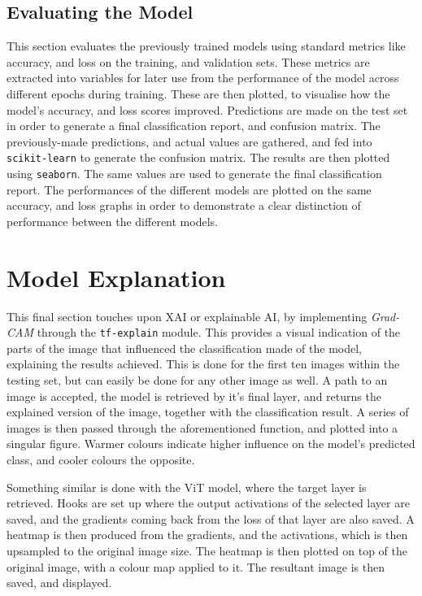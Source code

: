 \documentclass[../main]{subfiles}
\begin{document}
\subsection{Evaluating the Model}
This section evaluates the previously trained models using standard metrics like
accuracy, and loss on the training, and validation sets. These metrics are
extracted into variables for later use from the performance of the model across
different epochs during training. These are then plotted, to visualise how the
model's accuracy, and loss scores improved. Predictions are made on the test set
in order to generate a final classification report, and confusion matrix. The
previously-made predictions, and actual values are gathered, and fed into
\texttt{scikit-learn} to generate the confusion matrix. The results are then
plotted using \texttt{seaborn}. The same values are used to generate the final
classification report. The performances of the different models are plotted on
the same accuracy, and loss graphs in order to demonstrate a clear distinction
of performance between the different models.
 
\section{Model Explanation}
This final section touches upon XAI or explainable AI, by implementing
\emph{Grad-CAM} through the \texttt{tf-explain} module. This provides a visual
indication of the parts of the image that influenced the classification made of
the model, explaining the results achieved. This is done for the first ten
images within the testing set, but can easily be done for any other image as
well. A path to an image is accepted, the model is retrieved by it's final
layer, and returns the explained version of the image, together with the
classification result. A series of images is then passed through the
aforementioned function, and plotted into a singular figure. Warmer colours
indicate higher influence on the model's predicted class, and cooler colours
the opposite.

Something similar is done with the ViT model, where the target layer is
retrieved. Hooks are set up where the output activations of the selected layer
are saved, and the gradients coming back from the loss of that layer are also
saved. A heatmap is then produced from the gradients, and the activations,
which is then upsampled to the original image size. The heatmap is then plotted
on top of the original image, with a colour map applied to it. The resultant
image is then saved, and displayed.
\end{document}

